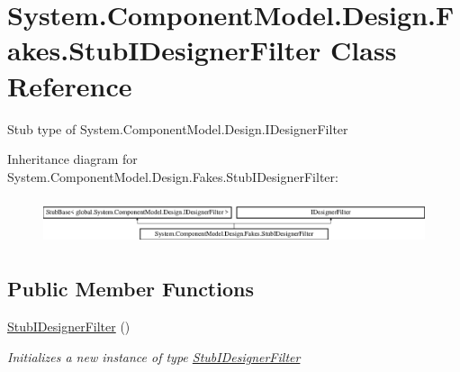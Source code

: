 \hypertarget{class_system_1_1_component_model_1_1_design_1_1_fakes_1_1_stub_i_designer_filter}{\section{System.\-Component\-Model.\-Design.\-Fakes.\-Stub\-I\-Designer\-Filter Class Reference}
\label{class_system_1_1_component_model_1_1_design_1_1_fakes_1_1_stub_i_designer_filter}
}


Stub type of System.\-Component\-Model.\-Design.\-I\-Designer\-Filter 


Inheritance diagram for System.\-Component\-Model.\-Design.\-Fakes.\-Stub\-I\-Designer\-Filter\-:\begin{figure}[H]
\begin{center}
\leavevmode
\includegraphics[height=1.375921cm]{class_system_1_1_component_model_1_1_design_1_1_fakes_1_1_stub_i_designer_filter}
\end{center}
\end{figure}
\subsection*{Public Member Functions}
\begin{DoxyCompactItemize}
\item 
\hyperlink{class_system_1_1_component_model_1_1_design_1_1_fakes_1_1_stub_i_designer_filter_a7f1585b9b0b50d7e0183d6389a2b9c40}{Stub\-I\-Designer\-Filter} ()
\begin{DoxyCompactList}\small\item\em Initializes a new instance of type \hyperlink{class_system_1_1_component_model_1_1_design_1_1_fakes_1_1_stub_i_designer_filter}{Stub\-I\-Designer\-Filter}\end{DoxyCompactList}\end{DoxyCompactItemize}
